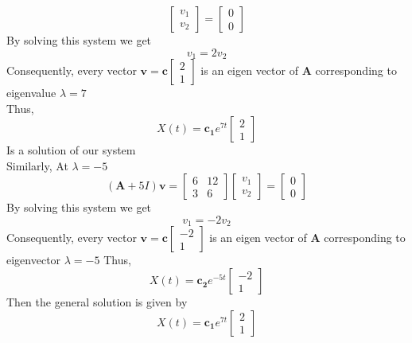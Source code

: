 \begin{example}
\[\begin{bmatrix}
            v_{1} \\
            v_{2}
        \end{bmatrix}=
        \begin{bmatrix}
            0 \\
            0
        \end{bmatrix}
    \]
    By solving this system we get
    \[
        v_1 = 2v_2
    \]
    Consequently, every vector $\mathbf{v} = \mathbf{c}
        \begin{bmatrix}
            2 \\
            1
        \end{bmatrix}
    $ is an eigen vector of $\mathbf{A}$ corresponding to eigenvalue $\lambda = 7$\\
    Thus,
    $$X(t) = \mathbf{c_1} e^{7t}
        \begin{bmatrix}
            2 \\
            1
        \end{bmatrix}
    $$
    Is a solution of our system\\
    Similarly, At $\lambda = -5$
    $$(\mathbf{A} + 5 I) \mathbf{v} =
        \begin{bmatrix}
            6 & 12 \\
            3 & 6
        \end{bmatrix}
        \begin{bmatrix}
            v_{1} \\
            v_{2}
        \end{bmatrix}=
        \begin{bmatrix}
            0 \\
            0
        \end{bmatrix}
    $$
    By solving this system we get
    \[
        v_1 = -2v_2
    \]
    Consequently, every vector $\mathbf{v} = \mathbf{c}
        \begin{bmatrix}
            -2 \\
            1
        \end{bmatrix}
    $ is an eigen vector of $\mathbf{A}$ corresponding to eigenvector $\lambda =-5$ Thus,
    $$X(t) = \mathbf{c_2}e^{-5t}
        \begin{bmatrix}
            -2 \\
            1
        \end{bmatrix}
    $$
    Then the general solution is given by
    \[
        X(t) =\mathbf{c_1} e^{7t}\begin{bmatrix}
            2 \\1

\end{bmatrix}\]
\end{example}

